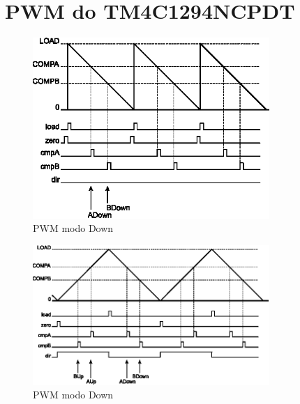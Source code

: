 \section{PWM do TM4C1294NCPDT}

\begin{figure}[H]
	\centering
	\includegraphics[width=0.8\textwidth] {figuras/PWMCountDownMode.eps}
	\caption{PWM modo Down \cite{DATASHEET_TIVA}}
	\label{fig:PWMCountDownMode}
\end{figure}

\begin{figure}[H]
	\centering
	\includegraphics[width=0.8\textwidth] {figuras/PWMCountUpDownMode.eps}
	\caption{PWM modo Down \cite{DATASHEET_TIVA}}
	\label{fig:PWMCountUpDownMode}
\end{figure}